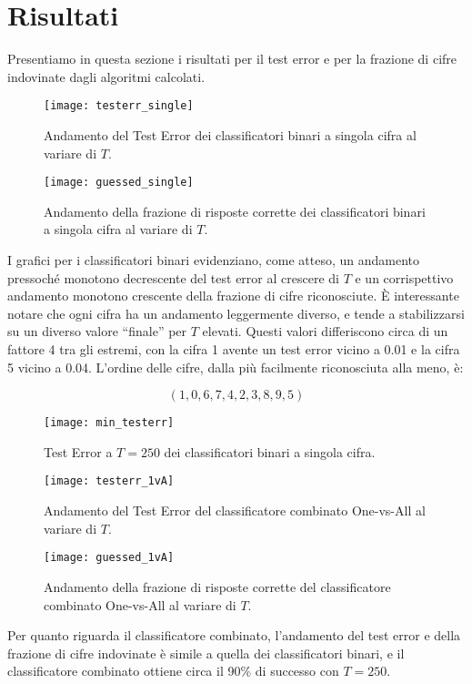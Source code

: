 
\section{Risultati}
Presentiamo in questa sezione i risultati per il test error e per la frazione di cifre indovinate dagli algoritmi calcolati.

\begin{figure}[H]
\centering
\texttt{[image: testerr\_single]}
\caption{Andamento del Test Error dei classificatori binari a singola cifra al variare di $T$.}

\texttt{[image: guessed\_single]}
\caption{Andamento della frazione di risposte corrette dei classificatori binari a singola cifra al variare di $T$.}
\label{fig:single}
\end{figure}


I grafici per i classificatori binari evidenziano, come atteso, un andamento pressoch\'e monotono decrescente del test error al crescere di $T$ e un corrispettivo andamento monotono crescente della frazione di cifre riconosciute. \`E interessante notare che ogni cifra ha un andamento leggermente diverso, e tende a stabilizzarsi su un diverso valore ``finale'' per $T$ elevati. Questi valori differiscono circa di un fattore 4 tra gli estremi, con la cifra 1 avente un test error vicino a 0.01 e la cifra 5 vicino a 0.04. L'ordine delle cifre, dalla pi\`u facilmente riconosciuta alla meno, \`e:

\[(1, 0, 6, 7, 4, 2, 3, 8, 9, 5)\]

\begin{figure}[h]
\centering
\texttt{[image: min\_testerr]}
\caption{Test Error a \(T = 250\) dei classificatori binari a singola cifra.}
\label{fig:min_testerr}
\end{figure}


\begin{figure}[h]
\centering
\texttt{[image: testerr\_1vA]}
\caption{Andamento del Test Error del classificatore combinato One-vs-All al variare di $T$.}

\texttt{[image: guessed\_1vA]}
\caption{Andamento della frazione di risposte corrette del classificatore combinato One-vs-All al variare di $T$.}
\label{fig:1vA}
\end{figure}

Per quanto riguarda il classificatore combinato, l'andamento del test error e della frazione di cifre indovinate \`e simile a quella dei classificatori binari, e il classificatore combinato ottiene circa il 90\% di successo con \(T = 250\). 